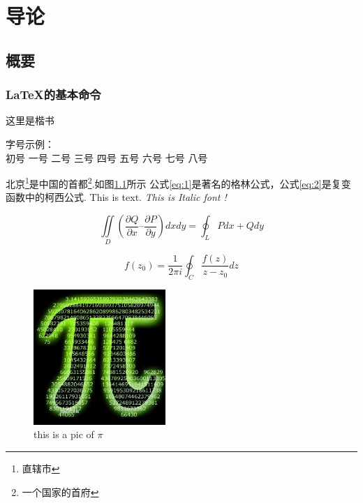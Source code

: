 \chapter{导论}
\section{概要}
\lipsum[1]
\subsection{\LaTeX{}的基本命令}

{\kaishu  这里是楷书} 

\begin{center}
	 字号示例：\\
	{初号}
	{一号}
	{二号}
	{三号}
	{四号}
	{五号}
	{六号}
	{七号}
	{八号}
\end{center}



北京\footnote{直辖市}是中国的首都\footnote{一个国家的首府}.如图\ref{fig:1}所示
公式\ref{eq:1}是著名的格林公式，公式\ref{eq:2}是复变函数中的柯西公式.
This is  text.\newline
\textit{This is Italic font !}

\begin{multicols}{2}
	\lipsum[1]
\end{multicols}  

\begin{equation}
    \label{eq:1}
	\iint\limits_{{D}} {(\frac{{\partial Q}}{{\partial x}} – \frac{{\partial P}}{{\partial y}})}dxdy = \oint_{L} {Pdx + Qdy}
\end{equation}

\begin{equation}
	\label{eq:2}
	f(z_0)=\frac{1}{2\pi i}\oint_{C}^{ } \frac{f(z)}{z-z_0}dz
\end{equation}
 
 
\begin{figure}[!htbp]   %
	\centering
	\includegraphics[width=5cm]{./image/ch1/0.jpg}
	\caption{this is a pic of $\pi$}
	\label{fig:1}
\end{figure}

